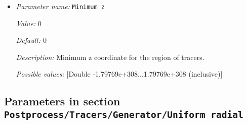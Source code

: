 \begin{itemize}
{\it Value:} 0


{\it Default:} 0


{\it Description:} Minimum y coordinate for the region of tracers.


{\it Possible values:} [Double -1.79769e+308...1.79769e+308 (inclusive)]
\item {\it Parameter name:} {\tt Minimum z}
\label{parameters:Postprocess/Tracers/Generator/Uniform box/Minimum z}


{\it Value:} 0


{\it Default:} 0


{\it Description:} Minimum z coordinate for the region of tracers.


{\it Possible values:} [Double -1.79769e+308...1.79769e+308 (inclusive)]
\end{itemize}

\subsection{Parameters in section \tt Postprocess/Tracers/Generator/Uniform radial}
\label{parameters:Postprocess/Tracers/Generator/Uniform_20radial}

